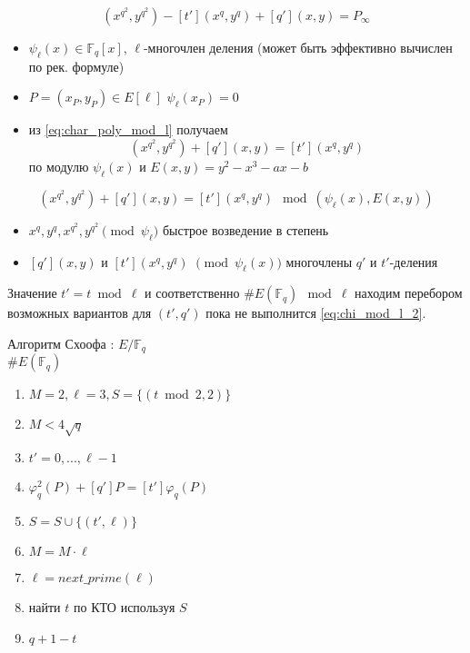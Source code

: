 \documentclass{beamer}
\begin{document}
\begin{frame}
\begin{equation}
    \label{eq:char_poly_mod_l}
(x^{q^2}, y^{q^2}) - [t'] (x^{q}, y^{q}) + [q'](x,y) = P_\infty
\end{equation}
\begin{itemize}
    \item $\psi_\ell(x) \in \mathbb{F}_q[x]$, $\ell$-многочлен деления (может быть эффективно вычислен по рек. формуле)
    \item $P = (x_P, y_P) \in E[\ell]$ \structure{$\iff$} $\psi_\ell(x_P) = 0$
    \item из \eqref{eq:char_poly_mod_l} получаем
    \[(x^{q^2}, y^{q^2}) + [q'](x,y) = [t'] (x^{q}, y^{q})\]
    по модулю $\psi_\ell(x)$ и $E(x,y) = y^2 - x^3 - a x - b$
\end{itemize}
\end{frame}

\begin{frame}
    \begin{equation}
    \label{eq:chi_mod_l_2}
    (x^{q^2}, y^{q^2}) + [q'](x,y) = [t'] (x^{q}, y^{q}) 
    ~\bmod (\psi_\ell(x), E(x,y))
    \end{equation}
    \begin{itemize}
        \item $x^q, y^q, x^{q^2}, y^{q^2} \pmod{\psi_\ell} $ \structure{$\implies$} быстрое возведение в степень 
        \item $[q'](x,y)$ и $[t'](x^q, y^q)$ $\pmod{\psi_\ell(x)}$ \structure{$\implies$} многочлены $q'$ и $t'$-деления
    \end{itemize}
    Значение $t' = t\bmod{\ell}$ и соответственно $\#E(\mathbb{F}_q)~\bmod{\ell}$ находим перебором возможных вариантов для $(t',q')$ пока не выполнится \eqref{eq:chi_mod_l_2}.
\end{frame}

\begin{frame}{Алгоритм Схоофа}
: $E/\mathbb{F}_q$\\
 $\#E(\mathbb{F}_q)$\\
\begin{enumerate}
    \item $M = 2, \ell = 3, S = \{(t \bmod{2}, 2)\}$
    \item {} $M < 4 \sqrt{q}$ 
    \item \quad {} $t' = 0, ..., \ell-1$ 
    \item \quad \quad {} $\varphi_q^2(P) + [q'] P = [t']\varphi_q(P)$  
    \item \quad $S = S \cup \{ (t',\ell) \}$
    \item \quad $M = M \cdot \ell$
    \item \quad $\ell = next\_prime(\ell)$
    \item найти $t$ по КТО используя $S$
    \item {} $q + 1 - t$
\end{enumerate}
\end{frame}
\end{document}
